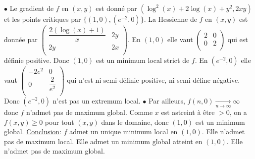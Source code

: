 \documentclass{fancybook}
\begin{document}
$\bullet$ Le gradient de $f$ en $(x,y)$ est donné par $\left(\log ^2(x)+2 \log (x)+y^2,2 x y\right)$ et les points critiques par $\{(1,0),(e^{-2},0) \}$. \newline
La Hessienne de $f$ en $(x,y)$ est donnée par $\left(
\begin{array}{cc}
 \dfrac{2 (\log (x)+1)}{x} & 2 y \\
 2 y & 2 x \\
\end{array}
\right)$. \newline
En $(1,0)$ elle vaut $\left(
\begin{array}{cc}
 2 & 0 \\
 0 & 2 \\
\end{array}
\right)$ qui est définie positive. Donc $(1,0)$ est un minimum local strict de $f$.\newline
En $(e^{-2},0)$ elle vaut $\left(
\begin{array}{cc}
 -2 e^2 & 0 \\
 0 & \dfrac{2}{e^2} \\
\end{array}
\right)$ qui n'est ni semi-définie positive, ni semi-défine négative. Donc $(e^{-2},0)$ n'est pas un extremum local. \newline
$\bullet$ Par ailleurs, $f(n,0)\xrightarrow[n\to \infty]{}\infty$ donc $f$ n'admet pas de maximum global. \newline
Comme $x$ est astreint à être $>0$, on a $f(x,y)\geq 0$ pour tout $(x,y)$ dans le domaine, donc $(1,0)$ est un minimum global.
\newline
\newline
\underline{Conclusion}: $f$ admet un unique minimum local en $(1,0)$. Elle n'admet pas de maximum local. Elle admet un minimum global atteint en $(1,0)$. Elle n'admet pas de maximum global.
\end{document}
